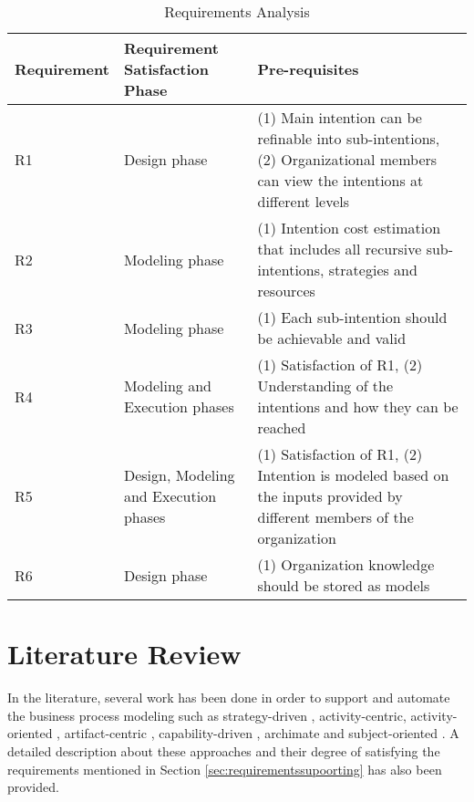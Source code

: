 \begin{table} [htbp]
	\centering
	\begin{tabular} {p{2.5cm}p{3cm}p{8cm}}
		\toprule
		\textbf{Requirement} & \textbf{Requirement Satisfaction Phase} & \textbf{Pre-requisites}    \\
		\midrule                                                                                                               
		R1    & Design phase    &(1) Main intention can be refinable into sub-intentions, (2) Organizational members can view the intentions at different levels    \\ 
		
		R2   & Modeling phase    &(1) Intention cost estimation that includes all recursive sub-intentions, strategies and resources \\         
			
		R3   & Modeling phase       &(1) Each sub-intention should  be achievable and valid \\      
		
		R4   & Modeling and Execution phases     &(1) Satisfaction of R1, (2) Understanding of the intentions and how they can be reached \\                         
			
		R5  &Design, Modeling and Execution phases  &(1) Satisfaction of R1, (2) Intention is modeled based on the inputs provided by different members of the organization               \\ 
		
		R6   & Design phase         &(1) Organization knowledge should be stored as models \\        
		
		\bottomrule
	\end{tabular}
	\caption{Requirements Analysis}
	\label{tab:subrequirements}
\end{table}

\section{Literature Review}
\label{sec:literaturereview}
In the literature, several work has been done in order to support and automate the business process modeling such as strategy-driven \cite{bider2005strategy}, activity-centric\cite{Yarosh2009}, activity-oriented \cite{Reijers2006}, artifact-centric \cite{Cohn2009}, capability-driven \cite{Stirna2012}, archimate \cite{Aldea2015} and subject-oriented \cite{Fleischmann2013}.  A detailed description about these approaches and their degree of satisfying the requirements mentioned in Section \ref{sec:requirementssupoorting} has also been provided. 

